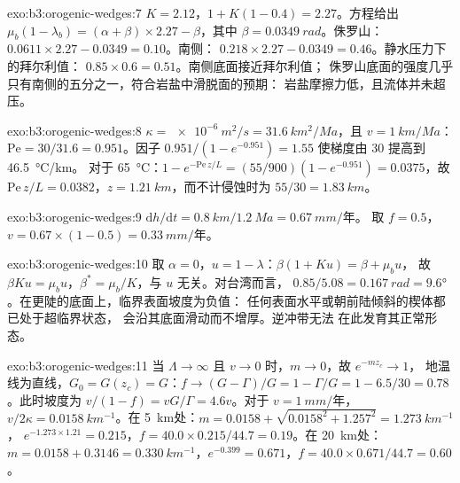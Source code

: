 \begin{solution}{exo:b3:orogenic-wedges:7}
$K = 2.12$，$1 + K(1 - 0.4) = 2.27$。方程给出 $\mu_b(1 -
\lambda_b) = (\alpha + \beta)\times2.27 - \beta$，其中 $\beta =
\qty{0.0349}{rad}$。侏罗山：$0.0611\times2.27 - 0.0349 = 0.10$。南侧：
$0.218\times2.27 - 0.0349 = 0.46$。静水压力下的拜尔利值：
$0.85\times0.6 = 0.51$。南侧底面接近拜尔利值；
侏罗山底面的强度几乎只有南侧的五分之一，符合岩盐中滑脱面的预期：
岩盐摩擦力低，且流体并未超压。
\end{solution}

\begin{solution}{exo:b3:orogenic-wedges:8}
$\kappa = \qty{e-6}{m^2/s} = \qty{31.6}{km^2/Ma}$，且 $v =
\qty{1}{km/Ma}$：$\mathrm{Pe} = 30/31.6 = 0.951$。因子 $0.951/(1 -
e^{-0.951}) = 1.55$ 使梯度由 30 提高到 \qty{46.5}{\celsius/km}。
对于 \qty{65}{\celsius}：$1 - e^{-\mathrm{Pe}\,z/L} = (55/900)(1 - e^{-0.951})
= 0.0375$，故 $\mathrm{Pe}\,z/L = 0.0382$，$z = \qty{1.21}{km}$，而不计侵蚀时为
$55/30 = \qty{1.83}{km}$。
\end{solution}

\begin{solution}{exo:b3:orogenic-wedges:9}
$\mathrm dh/\mathrm dt = \qty{0.8}{km}/\qty{1.2}{Ma} = \qty{0.67}{mm/\text{年}}$。
取 $f = 0.5$，$v = 0.67\times(1 - 0.5) = \qty{0.33}{mm/\text{年}}$。
\end{solution}

\begin{solution}{exo:b3:orogenic-wedges:10}
取 $\alpha = 0$，$u = 1 - \lambda$：$\beta(1 + Ku) = \beta + \mu_b u$，
故 $\beta Ku = \mu_b u$，$\beta^* = \mu_b/K$，与 $u$ 无关。对台湾而言，
$0.85/5.08 = \qty{0.167}{rad} = \ang{9.6}$。在更陡的底面上，临界表面坡度为负值：
任何表面水平或朝前陆倾斜的楔体都已处于超临界状态，
会沿其底面滑动而不增厚。逆冲带无法
在此发育其正常形态。
\end{solution}

\begin{solution}{exo:b3:orogenic-wedges:11}
当 $\Lambda \to \infty$ 且 $v \to 0$ 时，$m \to 0$，故 $e^{-mz_c} \to 1$，
地温线为直线，$G_0 = G(z_c) = G$：$f \to (G - \Gamma)/G = 1 -
\Gamma/G = 1 - 6.5/30 = 0.78$。此时坡度为 $v/(1 - f) = vG/\Gamma =
4.6v$。对于 $v = \qty{1}{mm/\text{年}}$，$v/2\kappa = \qty{0.0158}{km^{-1}}$。在
\qty{5}{km}处：$m = 0.0158 + \sqrt{0.0158^2 + 1.257^2} = \qty{1.273}{km^{-1}}$，
$e^{-1.273\times1.21} = 0.215$，$f = 40.0\times0.215/44.7 = 0.19$。在
\qty{20}{km}处：$m = 0.0158 + 0.3146 = \qty{0.330}{km^{-1}}$，$e^{-0.399} =
0.671$，$f = 40.0\times0.671/44.7 = 0.60$。
\end{solution}


